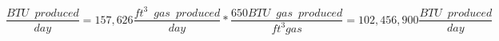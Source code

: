                     $
                        \dfrac 
                        {
                        BTU \enspace produced
                        }
                        {
                        day
                        }
                        =
                        157,626 \dfrac
                                {
                                ft^3 \enspace gas \enspace produced
                                }
                                {
                                day
                                }
                                *
                            \dfrac
                            {
                            650 BTU \enspace gas \enspace produced
                            }
                            {
                            ft^3 gas
                            }
                            =\boxed{102,456,900 \dfrac
                                    {
                                    BTU \enspace produced
                                    }
                                    {
                                    day
                                    }}
                    $






